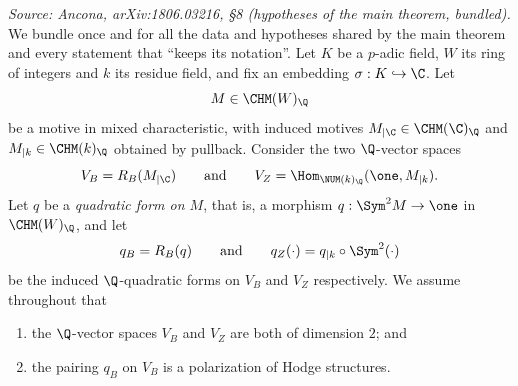 \begin{definition}
  \label{def:mainthm-setup}
  \textit{Source: Ancona, arXiv:1806.03216, §8 (hypotheses of the main theorem, bundled).}
  We bundle once and for all the data and hypotheses shared by the main theorem
  and every statement that ``keeps its notation''. Let \(K\) be a \(p\)-adic
  field, \(W\) its ring of integers and \(k\) its residue field, and fix an
  embedding \(\sigma : K \hookrightarrow \C\). Let
  \[M \in \CHM(W)_\Q\]
  be a motive in mixed characteristic, with induced motives
  \(M_{\vert\C} \in \CHM(\C)_\Q\) and \(M_{\vert{k}} \in \CHM(k)_\Q\) obtained by
  pullback. Consider the two \(\Q\)-vector spaces
  \[V_B = R_B(M_{\vert\C}) \qquad \text{and} \qquad
    V_Z = \Hom_{\NUM(k)_\Q}(\one, M_{\vert{k}}).\]
  Let \(q\) be a \emph{quadratic form on \(M\)}, that is, a morphism
  \(q : \Sym^2 M \to \one\) in \(\CHM(W)_\Q\), and let
  \[q_B = R_B(q) \qquad \text{and} \qquad
    q_Z(\cdot) = q_{\vert{k}} \circ \Sym^2(\cdot)\]
  be the induced \(\Q\)-quadratic forms on \(V_B\) and \(V_Z\) respectively. We
  assume throughout that
  \begin{enumerate}
    \item the \(\Q\)-vector spaces \(V_B\) and \(V_Z\) are both of dimension
      \(2\); and
    \item the pairing \(q_B\) on \(V_B\) is a polarization of Hodge structures.
  \end{enumerate}
\end{definition}

